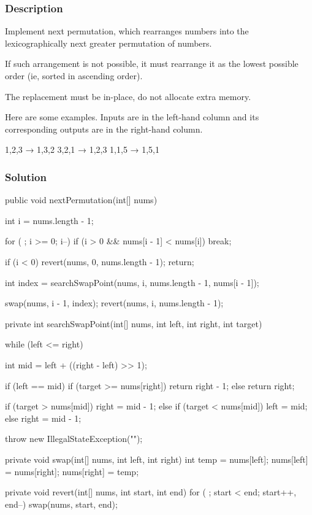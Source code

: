 \subsubsection{Description}
Implement next permutation, which rearranges numbers into the lexicographically next greater permutation of numbers.

If such arrangement is not possible, it must rearrange it as the lowest possible order (ie, sorted in ascending order).

The replacement must be in-place, do not allocate extra memory.

Here are some examples. Inputs are in the left-hand column and its corresponding outputs are in the right-hand column.
\begin{Code}
1,2,3 → 1,3,2
3,2,1 → 1,2,3
1,1,5 → 1,5,1
\end{Code}

\subsubsection{Solution}

\begin{Code}
public void nextPermutation(int[] nums) {
    int i = nums.length - 1;

    for ( ; i >= 0; i--) {
        if (i > 0 && nums[i - 1] < nums[i]) {
            break;
        }
    }

    if (i < 0) {
        revert(nums, 0, nums.length - 1);
        return;
    }

    int index = searchSwapPoint(nums, i, nums.length - 1, nums[i - 1]);

    swap(nums, i - 1, index);
    revert(nums, i, nums.length - 1);
}

private int searchSwapPoint(int[] nums, int left, int right, int target) {
    while (left <= right) {
        int mid = left + ((right - left) >> 1);

        if (left == mid) {
            if (target >= nums[right]) {
                return right - 1;
            } else {
                return right;
            }
        }

        if (target > nums[mid]) {
            right = mid - 1;
        } else if (target < nums[mid]) {
            left = mid;
        } else {
            right = mid - 1;
        }
    }

    throw new IllegalStateException("");
}

private void swap(int[] nums, int left, int right) {
    int temp = nums[left];
    nums[left] = nums[right];
    nums[right] = temp;
}

private void revert(int[] nums, int start, int end) {
    for ( ; start < end; start++, end--) {
        swap(nums, start, end);
    }
}
\end{Code}

